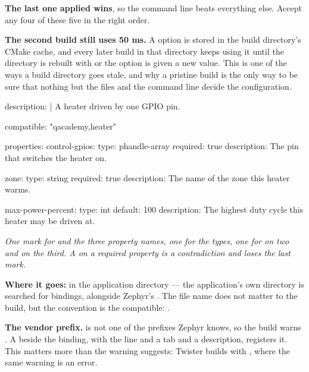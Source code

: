 \noindent\textbf{The last one applied wins}, so the command line beats everything else. Accept any
four of these five in the right order. 

\textbf{The second build still uses 50 ms.} A  option is stored in the build
directory's CMake cache, and every later build in that directory keeps using it until the directory
is rebuilt with  or the option is given a new value. This is one of the ways a build
directory goes stale, and why a pristine build is the only way to be sure that nothing but the files
and the command line decide the configuration. 



\begin{yamlcode}
description: |
  A heater driven by one GPIO pin.

compatible: "qacademy,heater"

properties:
  control-gpios:
    type: phandle-array
    required: true
    description: The pin that switches the heater on.

  zone:
    type: string
    required: true
    description: The name of the zone this heater warms.

  max-power-percent:
    type: int
    default: 100
    description: The highest duty cycle this heater may be driven at.
\end{yamlcode}

\noindent{}

\noindent\emph{One mark for  and the three property names, one for the types, one
for  on two and  on the third. A  on a
required property is a contradiction and loses the last mark.}

\textbf{Where it goes:}  in the application directory --- the application's own
directory is searched for bindings, alongside Zephyr's . The file name does not
matter to the build, but the convention is the compatible:
. 

\textbf{The vendor prefix.}  is not one of the prefixes Zephyr knows, so the build
warns . A  beside the
binding, with the line  and a tab and a description, registers it. This matters more
than the warning suggests: Twister builds with , where the same warning is an
error. 

